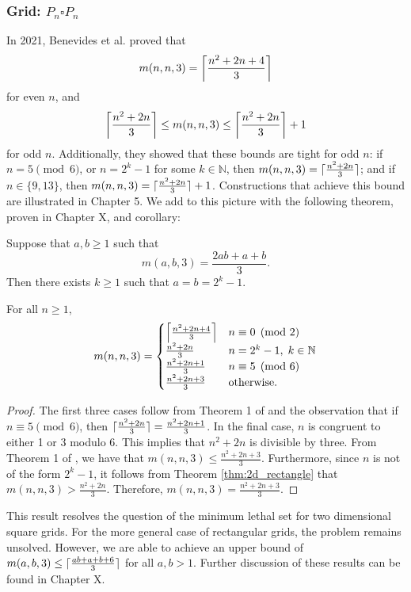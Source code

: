 \subsubsection{Grid: $P_n \square P_n$}

In 2021, Benevides et al. proved that 
$$m(n,n,3) = \ceil*{\frac{n^2+2n+4}{3}}$$
for even $n$, and 
$$\ceil*{\frac{n^2+2n}{3}} \leq m(n,n,3) \leq \ceil*{\frac{n^2+2n}{3}} + 1$$
for odd $n$. Additionally, they showed that these bounds are tight for odd $n$: if $n = 5 \pmod 6$, or $n = 2^k - 1$ for some $k \in \mathbb{N}$, then $m(n,n,3) = \ceil{\frac{n^2+2n}{3}}$; and if $n \in \{9,13\}$, then $m(n,n,3) = \ceil{\frac{n^2+2n}{3}} + 1$. Constructions that achieve this bound are illustrated in Chapter 5. We add to this picture with the following theorem, proven in Chapter X, and corollary:

\begin{thm}
\label{thm:2d_rectangle}
Suppose that $a, b \geq 1$ such that
$$m(a,b,3) = \frac{2ab+a+b}{3}.$$
Then there exists $k \geq 1$ such that $a=b=2^k-1$.
\end{thm}

\begin{cor}
For all $n \geq 1$,
$$ m(n,n,3) =
\begin{cases} 
      \ceil*{\frac{n^2+2n+4}{3}} & n \equiv 0 \pmod 2 \\
      \frac{n^2+2n}{3} & n = 2^k-1, \; k \in \mathbb{N} \\
      \frac{n^2+2n+1}{3} & n \equiv 5 \pmod 6 \\
      \frac{n^2+2n+3}{3} & \text{otherwise.}
   \end{cases}
$$
\end{cor}

\begin{proof}
The first three cases follow from Theorem 1 of \cite{benevides:2021} and the observation that if $n \equiv 5 \pmod 6$, then $\ceil{\frac{n^2+2n}{3}} = \frac{n^2+2n+1}{3}$. In the final case, $n$ is congruent to either 1 or 3 modulo 6. This implies that $n^2 + 2n$ is divisible by three. From Theorem 1 of \cite{benevides:2021}, we have that $m(n,n,3) \leq \frac{n^2+2n+3}{3}$. Furthermore, since $n$ is not of the form $2^k-1$, it follows from Theorem \ref{thm:2d_rectangle} that $m(n,n,3) > \frac{n^2+2n}{3}$. Therefore, $m(n,n,3) = \frac{n^2+2n+3}{3}$.
\end{proof}

This result resolves the question of the minimum lethal set for two dimensional square grids. For the more general case of rectangular grids, the problem remains unsolved. However, we are able to achieve an upper bound of $m(a,b,3) \leq \ceil{\frac{ab+a+b+6}{3}}$ for all $a,b > 1$. Further discussion of these results can be found in Chapter X.

